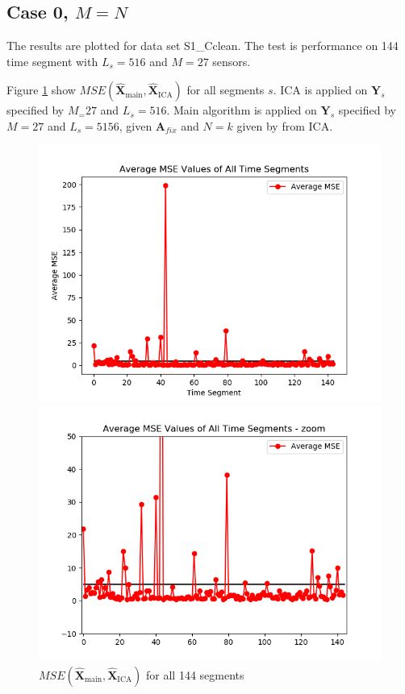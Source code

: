 \subsection{Case 0, $M=N$}
The results are plotted for data set S1\_Cclean. The test is performance on 144 time segment with $L_s = 516$ and $M = 27$ sensors. 

Figure \ref{fig:M=N_1} show $MSE\left(\hat{\mathbf{X}}_{\text{main}},\hat{\mathbf{X}}_{\text{ICA}}\right)$ for all segments $s$. ICA is applied on $\textbf{Y}_s$ specified by $M_= 27$ and $L_s = 516$.  Main algorithm is applied on $\textbf{Y}_s$ specified by $M=27$ and $L_s=5156$, given $\textbf{A}_{fix}$ and $N = k$ given by from ICA.
\begin{figure}[H]
    \begin{minipage}[t]{.45\textwidth}
		\centering
		\includegraphics[scale=0.5]{figures/ch_7/average_mse_non_removed_ica}
	\caption{$MSE\left(\hat{\mathbf{X}}_{\text{main}},\hat{\mathbf{X}}_{\text{ICA}}\right)$ for all 144 segments}
	\label{fig:M=N_1}
    \end{minipage} 
    \hfill
    \begin{minipage}[t]{.45\textwidth}
        \centering
		\includegraphics[scale=0.5]{figures/ch_7/average_mse_non_removed_ica_zoom.png}

\end{minipage}
\end{figure}
